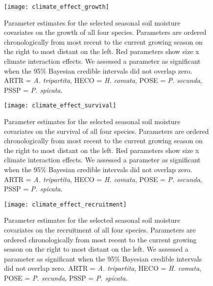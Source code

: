 \documentclass[11pt]{article}
\begin{document}
\begin{figure}[!htbp]
	\centering
	\texttt{[image: climate\_effect\_growth]}
	\caption{Parameter estimates for the selected seasonal soil moisture covariates on the growth of all four species. Parameters are ordered chronologically from most recent to the current growing season on the right to most distant on the left. Red parameters show size x climate interaction effects. We assessed a parameter as significant when the 95\% Bayesian credible intervals did not overlap zero.  ARTR = \textit{A. tripartita}, HECO = \textit{H. comata}, POSE = \textit{P. secunda}, PSSP = \textit{P. spicata}. }
	\label{fig:climateGrowth}
\end{figure}

\begin{figure}[!htbp]
	\centering
	\texttt{[image: climate\_effect\_survival]}
	\caption{Parameter estimates for the selected seasonal soil moisture covariates on the survival of all four species. Parameters are ordered chronologically from most recent to the current growing season on the right to most distant on the left. Red parameters show size x climate interaction effects. We assessed a parameter as significant when the 95\% Bayesian credible intervals did not overlap zero.  ARTR = \textit{A. tripartita}, HECO = \textit{H. comata}, POSE = \textit{P. secunda}, PSSP = \textit{P. spicata}. }
	\label{fig:climateSurvival}
\end{figure}


\begin{figure}[!htbp]
	\centering
	\texttt{[image: climate\_effect\_recruitment]}
	\caption{Parameter estimates for the selected seasonal soil moisture covariates on the recruitment of all four species. Parameters are ordered chronologically from most recent to the current growing season on the right to most distant on the left. We assessed a parameter as significant when the 95\% Bayesian credible intervals did not overlap zero.  ARTR = \textit{A. tripartita}, HECO = \textit{H. comata}, POSE = \textit{P. secunda}, PSSP = \textit{P. spicata}. }
	\label{fig:climateRecruitment}
\end{figure}
\end{document}
